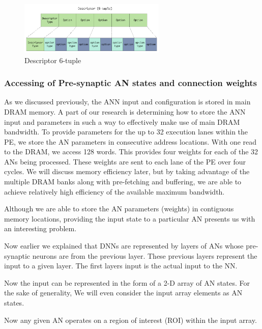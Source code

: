 \documentclass[journal]{IEEEtran}
\begin{document}
\begin{figure}[!t]
\centerline{
\mbox{\includegraphics[width=2.75in]{descriptorTuple.jpg}}
}
\caption{Descriptor 6-tuple}
\label{fig:descriptorTuple}
\end{figure}



\subsubsection{Accessing of Pre-synaptic AN states and connection weights}
\label{ssec:AccessingANStates}

As we discussed previously, the ANN input and configuration is stored in main DRAM memory. A part of our research is determining how to store the ANN input and parameters in such a way to effectively make use of main DRAM bandwidth. To provide parameters for the up to 32 execution lanes within the PE, we store the AN parameters in consecutive address locations. With one read to the DRAM, we access 128 words. This provides four weights for each of the 32 ANs being processed. These weights are sent to each lane of the PE over four cycles. We will discuss memory efficiency later, but by taking advantage of the multiple DRAM banks along with pre-fetching and buffering, we are able to achieve relatively high efficiency of the available maximum bandwidth.

Although we are able to store the AN parameters (weights) in contiguous memory locations, providing the input state to a particular AN presents us with an interesting problem.

Now earlier we explained that DNNs are represented by layers of ANs whose pre-synaptic neurons are from the previous layer. These previous layers represent the input to a given layer. The first layers input is the actual input to the NN.


Now the input can be represented in the form of a 2-D array of AN states. For the sake of generality, We will even consider the input array elements as AN states.

Now any given AN operates on a region of interest (ROI) within the input array.
\end{document}
